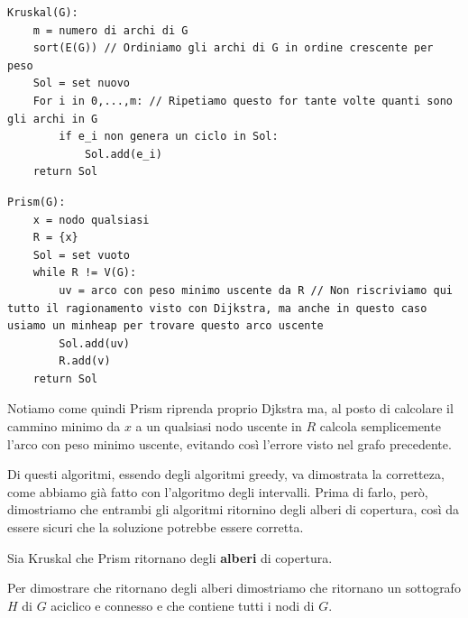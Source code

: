 \documentclass[11pt, a4paper, titlepage, oneside]{scrbook}
\begin{document}
\begin{lstlisting}
Kruskal(G):
    m = numero di archi di G
    sort(E(G)) // Ordiniamo gli archi di G in ordine crescente per peso
    Sol = set nuovo
    For i in 0,...,m: // Ripetiamo questo for tante volte quanti sono gli archi in G
        if e_i non genera un ciclo in Sol:
            Sol.add(e_i)
    return Sol
\end{lstlisting}

\begin{lstlisting}
Prism(G):
    x = nodo qualsiasi
    R = {x}
    Sol = set vuoto
    while R != V(G):
        uv = arco con peso minimo uscente da R // Non riscriviamo qui tutto il ragionamento visto con Dijkstra, ma anche in questo caso usiamo un minheap per trovare questo arco uscente
        Sol.add(uv)
        R.add(v)
    return Sol   
\end{lstlisting}

Notiamo come quindi Prism riprenda proprio Djkstra ma, al posto di calcolare il cammino minimo da $x$ a un qualsiasi nodo uscente in $R$ calcola semplicemente l'arco con peso minimo uscente, evitando così l'errore visto nel grafo precedente.

Di questi algoritmi, essendo degli algoritmi greedy, va dimostrata la corretteza, come abbiamo già fatto con l'algoritmo degli intervalli. Prima di farlo, però, dimostriamo che entrambi gli algoritmi ritornino degli alberi di copertura, così da essere sicuri che la soluzione potrebbe essere corretta.

\begin{Proposizione}[]
\label{propos-prim-kruskal}
Sia Kruskal che Prism ritornano degli \textbf{alberi} di copertura.
\end{Proposizione}

\Dimostrazione \nopagebreak

Per dimostrare che ritornano degli alberi dimostriamo che ritornano un sottografo $H$ di $G$ aciclico e connesso e che contiene tutti i nodi di $G$.
\end{document}
